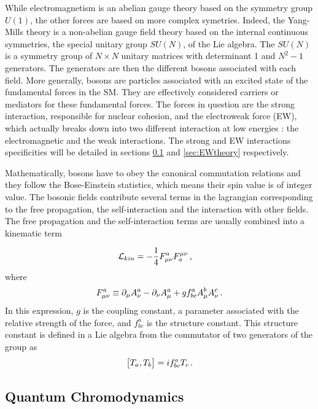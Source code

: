 While electromagnetism is an abelian gauge theory based on the symmetry group $U(1)$, the other forces are based on more complex symetries. Indeed, the Yang-Mills theory \cite{PhysRev.96.191} is a non-abelian gauge field theory based on the internal continuous symmetries, the special unitary group $SU(N)$, of the Lie algebra. The $SU(N)$ is a symmetry group of $N \times N$ unitary matrices with determinant 1 and $N^2 -1$ generators. The generators are then the different bosons associated with each field.
More generally, bosons are particles associated with an excited state of the fundamental forces in the SM. They are effectively considered carriers or mediators for these fundamental forces. The forces in question are the strong interaction, responsible for nuclear cohesion, and the electroweak force (EW), which actually breaks down into two different interaction at low energies : the electromagnetic and the weak interactions. The strong and EW interactions specificities will be detailed in sections \ref{sec:QCD} and \ref{sec:EWtheory} respectively. \newline

Mathematically, bosons have to obey the canonical commutation relations and they follow the Bose-Einstein statistics, which means their spin value is of integer value. The bosonic fields contribute several terms in the lagrangian corresponding to the free propagation, the self-interaction and the interaction with other fields. The free propagation and the self-interaction terms are usually combined into a kinematic term

\begin{equation}
    \Lagr_{kin} = -\frac{1}{4}F^{a}_{\mu\nu}F_{a}^{\mu\nu} \msep
\end{equation}
where
\begin{equation}
    F^{a}_{\mu\nu} \equiv \partial_{\mu}A_{\nu}^a - \partial_{\nu}A_{\mu}^a + g f_{bc}^a A_{\mu}^b A_{\nu}^c \mend
\end{equation}
In this expression, $g$ is the coupling constant, a parameter associated with the relative strength of the force, and $f_{bc}^a$ is the structure constant. This structure constant is defined in a Lie algebra from the commutator of two generators of the group as
\begin{equation}
    \big[ T_a , T_b \big] = i f_{bc}^a T_c \mend
    \label{eq:commut}
\end{equation}

\subsection{Quantum Chromodynamics}
\label{sec:QCD}

